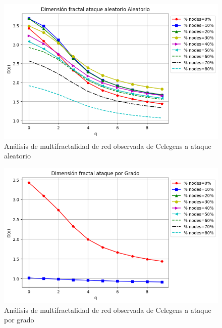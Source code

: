 \begin{figure}[H]
    \centering
    \includegraphics[scale=0.7]{Capitulo6MultifractalidadYRobustez/imagenes/grafica_DqRandom20180508_020345Celengs.png}
    \caption{Análisis de multifractalidad de red observada de Celegens a ataque aleatorio}
\end{figure}

\begin{figure}[H]
    \centering
    \includegraphics[scale=0.7]{Capitulo6MultifractalidadYRobustez/imagenes/grafica_DqDegree20180508_020345Celengs.png}
    \caption{Análisis de multifractalidad de red observada de Celegens a ataque por grado}
\end{figure}

